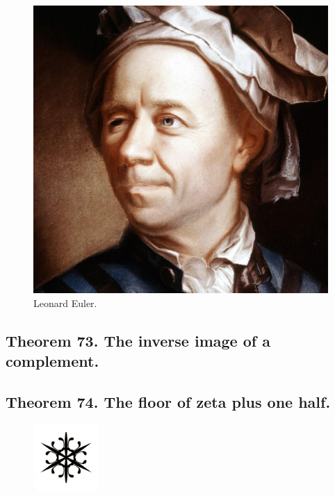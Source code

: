 \documentclass[preview]{standalone}
\begin{document}
\begin{figure}[!h]
    \centering
    \includegraphics[width=14cm]{../resources/jpg/2.3.functions/euler.jpg}
    \caption*{Leonard Euler.}
\end{figure}
\subsection[The inverse image of a complement under lambda.]
    {
        \color{section}Theorem 73. \color{black} The inverse image of a complement.
    }

\pagebreak


\subsection[The floor of zeta plus one half.]
    {
        \color{section}Theorem 74. \color{black} The floor of zeta plus one half.
    }

\begin{figure}[!h]
    \centering
    \includegraphics[width=2.5cm]{../resources/jpg/2.3.functions/symbol1.jpg}
\end{figure}
\pagebreak
\end{document}
